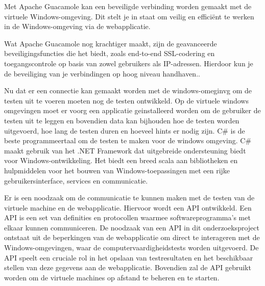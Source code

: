 Met Apache Guacamole kan een beveiligde verbinding worden gemaakt met de virtuele Windows-omgeving. Dit stelt je in staat om veilig en efficiënt te werken in de Windows-omgeving via de webapplicatie.

Wat Apache Guacamole nog krachtiger maakt, zijn de geavanceerde beveiligingsfuncties die het biedt, zoals end-to-end SSL-codering en toegangscontrole op basis van zowel gebruikers als IP-adressen. Hierdoor kun je de beveiliging van je verbindingen op hoog niveau handhaven.. ~\autocite{ApacheGuacamole} %

Nu dat er een connectie kan gemaakt worden met de windows-omeginvg om de testen uit te voeren moeten nog de testen ontwikkeld. Op de virtuele windows omgevingen moet er voorg een applicatie geinstalleerd worden om de gebruiker de testen uit te leggen en bovendien data kan bijhouden hoe de testen worden uitgevoerd, hoe lang de testen duren en hoeveel hints er nodig zijn. C\# is de beste programmeertaal om de testen te maken voor de windows omgeving. C\# maakt gebruik van het .NET Framework dat uitgebreide ondersteuning biedt voor Windows-ontwikkeling. Het biedt een breed scala aan bibliotheken en hulpmiddelen voor het bouwen van Windows-toepassingen met een rijke gebruikersinterface, services en communicatie.




Er is een noodzaak om de communicatie te kunnen maken met de testen van de virtuele machine en de webapplicatie. Hiervoor wordt een API ontwikkeld. Een API is een set van definities en protocollen waarmee softwareprogramma's met elkaar kunnen communiceren.
De noodzaak van een API in dit onderzoeksproject ontstaat uit de beperkingen van de webapplicatie om direct te interageren met de Windows-omgevingen, waar de computervaardigheidstests worden uitgevoerd. De API speelt een cruciale rol in het opslaan van testresultaten en het beschikbaar stellen van deze gegevens aan de webapplicatie. Bovendien zal de API gebruikt worden om de virtuele machines op afstand te beheren en te starten.


